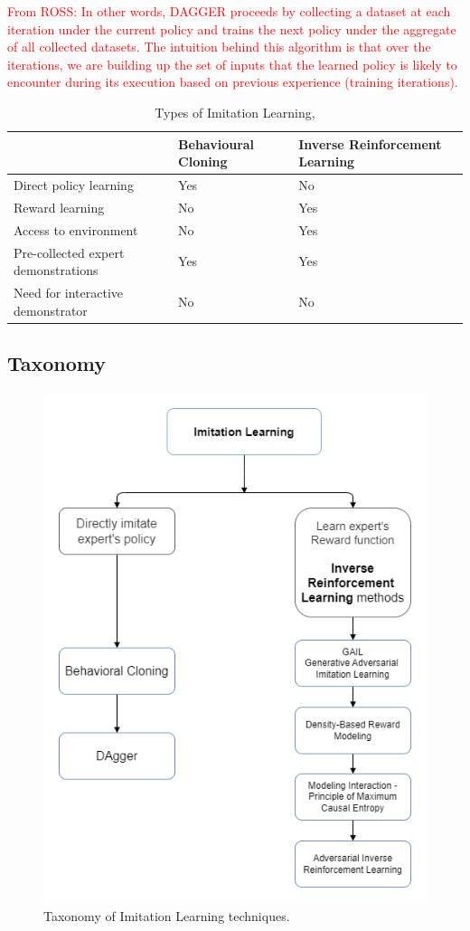 \documentclass{article}
\begin{document}
\textcolor{red}{From ROSS: In other words, DAGGER proceeds by collecting a dataset 	at each iteration under the current policy and trains the next 	policy under the aggregate of all collected datasets. The intuition 	behind this algorithm is that over the iterations, we 	are building up the set of inputs that the learned policy is 	likely to encounter during its execution based on previous experience (training iterations).}

\begingroup
\setlength{\tabcolsep}{6pt}
\begin{table}[h!]
\centering
\renewcommand{\arraystretch}{1.5} 
\begin{tabular}{L{6cm} L{3cm} L{3cm}}
	\midrule[0.01pt]
	& \textbf{Behavioural Cloning} & \textbf{Inverse Reinforcement Learning}\\
	\midrule[0.01pt]
	Direct policy learning & Yes & No \\
	Reward learning & No & Yes \\
	Access to environment & No & Yes \\
	Pre-collected expert demonstrations & Yes & Yes \\
	Need for interactive demonstrator & No & No \\
	\midrule[0.01pt]
\end{tabular}
\caption{Types of Imitation Learning, \cite{yue2018imitation}}
\label{tbl:BC_IRL}
\end{table}
\endgroup

\subsection{Taxonomy}\label{sec:Taxonomy}

\begin{figure}[H]
\centering
\includegraphics[width=0.6\linewidth]{images/IRL_Taxonomy.png}
\caption{Taxonomy of Imitation Learning techniques.}
\label{fig:taxonomy}
\end{figure}
\end{document}
